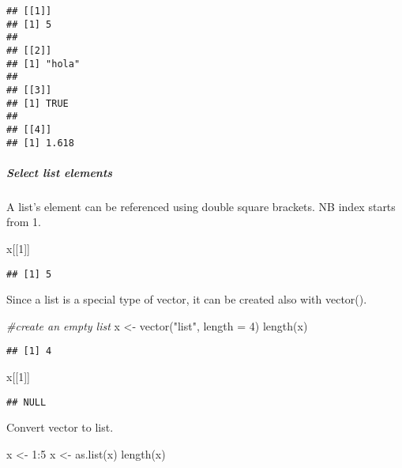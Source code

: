 \documentclass[
]{article}
\newenvironment{Shaded}{\begin{snugshade}}{\end{snugshade}}
\newcommand{\AttributeTok}[1]{\textcolor[rgb]{0.77,0.63,0.00}{#1}}
\newcommand{\CommentTok}[1]{\textcolor[rgb]{0.56,0.35,0.01}{\textit{#1}}}
\newcommand{\DecValTok}[1]{\textcolor[rgb]{0.00,0.00,0.81}{#1}}
\newcommand{\FunctionTok}[1]{\textcolor[rgb]{0.00,0.00,0.00}{#1}}
\newcommand{\NormalTok}[1]{#1}
\newcommand{\OtherTok}[1]{\textcolor[rgb]{0.56,0.35,0.01}{#1}}
\newcommand{\SpecialCharTok}[1]{\textcolor[rgb]{0.00,0.00,0.00}{#1}}
\newcommand{\StringTok}[1]{\textcolor[rgb]{0.31,0.60,0.02}{#1}}
\begin{document}
\begin{verbatim}
## [[1]]
## [1] 5
## 
## [[2]]
## [1] "hola"
## 
## [[3]]
## [1] TRUE
## 
## [[4]]
## [1] 1.618
\end{verbatim}

\hypertarget{select-list-elements}{%
\subparagraph{Select list elements}\label{select-list-elements}}

A list's element can be referenced using double square brackets. NB
index starts from 1.

\begin{Shaded}
\begin{Highlighting}[]
\NormalTok{x[[}\DecValTok{1}\NormalTok{]]}
\end{Highlighting}
\end{Shaded}

\begin{verbatim}
## [1] 5
\end{verbatim}

Since a list is a special type of vector, it can be created also with
vector().

\begin{Shaded}
\begin{Highlighting}[]
\CommentTok{\#create an empty list}
\NormalTok{x }\OtherTok{\textless{}{-}} \FunctionTok{vector}\NormalTok{(}\StringTok{"list"}\NormalTok{, }\AttributeTok{length =} \DecValTok{4}\NormalTok{)}
\FunctionTok{length}\NormalTok{(x)}
\end{Highlighting}
\end{Shaded}

\begin{verbatim}
## [1] 4
\end{verbatim}

\begin{Shaded}
\begin{Highlighting}[]
\NormalTok{x[[}\DecValTok{1}\NormalTok{]]}
\end{Highlighting}
\end{Shaded}

\begin{verbatim}
## NULL
\end{verbatim}

Convert vector to list.

\begin{Shaded}
\begin{Highlighting}[]
\NormalTok{x }\OtherTok{\textless{}{-}} \DecValTok{1}\SpecialCharTok{:}\DecValTok{5}
\NormalTok{x }\OtherTok{\textless{}{-}} \FunctionTok{as.list}\NormalTok{(x)}
\FunctionTok{length}\NormalTok{(x)}
\end{Highlighting}
\end{Shaded}
\end{document}
